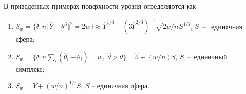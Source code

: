 \begin{ordre}
В приведенных примерах поверхности уровня определяются как
\begin{enumerate}
\item $S_w = \{\theta: n \Vert \overline{Y} - \theta^3 \Vert^2 = 2w\} \approx  \overline{Y}^{1/3} - (3\overline{Y}^{2/3})^{-1} \sqrt{2w/n} S^{1/3}$, $S$~--~ единичная сфера;
\item $S_w = \{\theta: n \sum_i (\widehat{\theta}_i - \theta_i ) = w, \; \widehat{\theta} > \theta\} =  \widehat{\theta} + (w/n) S$, $S$~--~единичный симплекс; 
\item $S_w =  \overline{Y}  + (w/n)^{1/\gamma} S$, $S$ -- единичная сфера.
\end{enumerate}
\end{ordre}








